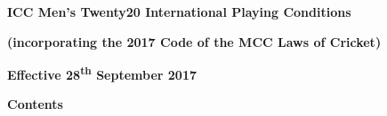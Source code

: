\documentclass[12pt]{article}
\begin{document}
\vspace{\baselineskip}

\vspace{\baselineskip}

\vspace{\baselineskip}

\vspace{\baselineskip}

\vspace{\baselineskip}

\vspace{\baselineskip}

\vspace{\baselineskip}

\vspace{\baselineskip}
\begin{Center}
{\fontsize{15pt}{18.0pt}\selectfont \textbf{ICC Men’s Twenty20 International Playing Conditions}\par}
\end{Center}\par


\vspace{\baselineskip}

\vspace{\baselineskip}
\begin{Center}
{\fontsize{11pt}{13.2pt}\selectfont \textbf{(incorporating the 2017 Code of the MCC Laws of Cricket)}\par}
\end{Center}\par


\vspace{\baselineskip}
\begin{Center}
\textbf{Effective 28\textsuperscript{th} September 2017}
\end{Center}\par


\vspace{\baselineskip}
\begin{adjustwidth}{2.92in}{0.0in}
{\fontsize{11pt}{13.2pt}\selectfont \textbf{Contents}\par}\par

\end{adjustwidth}


\vspace{\baselineskip}
{\fontsize{9pt}{10.8pt} \tabto{0.29in}  \tabto{6.42in} \par}\par
\end{document}
